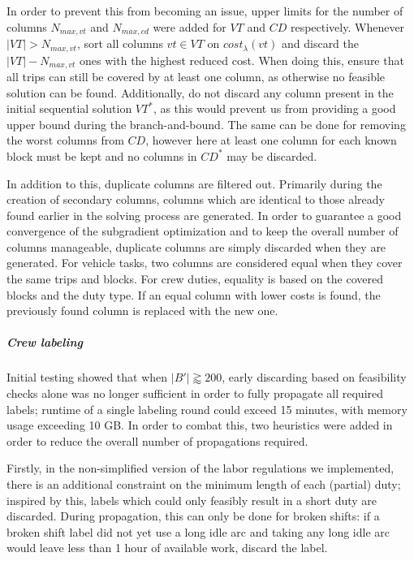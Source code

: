 \documentclass[]{article}
\begin{document}
In order to prevent this from becoming an issue, upper limits for the number of columns $N_{max,vt}$ and $N_{max,cd}$ were added for $VT$ and $CD$ respectively. Whenever $|VT| > N_{max,vt}$, sort all columns $vt \in VT$ on $cost_\lambda(vt)$ and discard the $|VT| - N_{max,vt}$ ones with the highest reduced cost. When doing this, ensure that all trips can still be covered by at least one column, as otherwise no feasible solution can be found. Additionally, do not discard any column present in the initial sequential solution $VT^*$, as this would prevent us from providing a good upper bound during the branch-and-bound. The same can be done for removing the worst columns from $CD$, however here at least one column for each known block must be kept and no columns in $CD^*$ may be discarded.

In addition to this, duplicate columns are filtered out. Primarily during the creation of secondary columns, columns which are identical to those already found earlier in the solving process are generated. In order to guarantee a good convergence of the subgradient optimization and to keep the overall number of columns manageable, duplicate columns are simply discarded when they are generated. For vehicle tasks, two columns are considered equal when they cover the same trips and blocks. For crew duties, equality is based on the covered blocks and the duty type. If an equal column with lower costs is found, the previously found column is replaced with the new one.

\subparagraph{Crew labeling} Initial testing showed that when $|B'| \gtrapprox 200$, early discarding based on feasibility checks alone was no longer sufficient in order to fully propagate all required labels; runtime of a single labeling round could exceed 15 minutes, with memory usage exceeding 10 GB. In order to combat this, two heuristics were added in order to reduce the overall number of propagations required.

Firstly, in the non-simplified version of the labor regulations we implemented, there is an additional constraint on the minimum length of each (partial) duty; inspired by this, labels which could only feasibly result in a short duty are discarded. During propagation, this can only be done for broken shifts: if a broken shift label did not yet use a long idle arc and taking any long idle arc would leave less than 1 hour of available work, discard the label.
\end{document}
